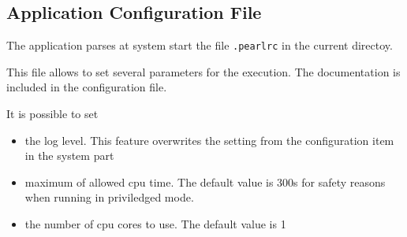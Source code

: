 \subsection{Application Configuration File}

The application parses at system start the file \texttt{.pearlrc} in
the current directoy.

This file allows to set several parameters for the execution.
The documentation is included in the configuration file.

It is possible to set
\begin{itemize}
\item the log level. This feature overwrites the setting 
   from the configuration item in the system part
\item maximum of allowed cpu time. The default value is 300s for safety reasons 
   when running in priviledged mode.
\item the number of cpu cores to use. The default value is 1
\end{itemize}


